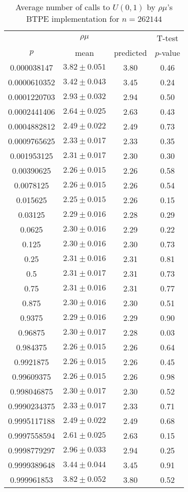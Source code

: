 \begin{table}[t]
\caption{Average number of calls to $U(0,1)$ by $\rho\mu$'s BTPE implementation for $n=262144$}
\label{tab:calls262144}
\begin{tabular}{cccc} \hline
    & $\rho\mu$ & & T-test \\
$p$ & mean & predicted & $p$-value \\ \hline
0.000038147  & $3.82 \pm 0.051$ & 3.80 & 0.46 \\
0.0000610352 & $3.42 \pm 0.043$ & 3.45 & 0.24 \\
0.0001220703 & $2.93 \pm 0.032$ & 2.94 & 0.50 \\
0.0002441406 & $2.64 \pm 0.025$ & 2.63 & 0.43 \\
0.0004882812 & $2.49 \pm 0.022$ & 2.49 & 0.73 \\
0.0009765625 & $2.33 \pm 0.017$ & 2.33 & 0.35 \\
0.001953125  & $2.31 \pm 0.017$ & 2.30 & 0.30 \\
0.00390625   & $2.26 \pm 0.015$ & 2.26 & 0.58 \\
0.0078125    & $2.26 \pm 0.015$ & 2.26 & 0.54 \\
0.015625     & $2.25 \pm 0.015$ & 2.26 & 0.15 \\
0.03125      & $2.29 \pm 0.016$ & 2.28 & 0.29 \\
0.0625       & $2.30 \pm 0.016$ & 2.29 & 0.22 \\
0.125        & $2.30 \pm 0.016$ & 2.30 & 0.73 \\
0.25         & $2.31 \pm 0.016$ & 2.31 & 0.81 \\
0.5          & $2.31 \pm 0.017$ & 2.31 & 0.73 \\
0.75         & $2.31 \pm 0.016$ & 2.31 & 0.77 \\
0.875        & $2.30 \pm 0.016$ & 2.30 & 0.51 \\
0.9375       & $2.29 \pm 0.016$ & 2.29 & 0.90 \\
0.96875      & $2.30 \pm 0.017$ & 2.28 & 0.03 \\
0.984375     & $2.26 \pm 0.015$ & 2.26 & 0.64 \\
0.9921875    & $2.26 \pm 0.015$ & 2.26 & 0.45 \\
0.99609375   & $2.26 \pm 0.015$ & 2.26 & 0.98 \\
0.998046875  & $2.30 \pm 0.017$ & 2.30 & 0.52 \\
0.9990234375 & $2.33 \pm 0.017$ & 2.33 & 0.71 \\
0.9995117188 & $2.49 \pm 0.022$ & 2.49 & 0.68 \\
0.9997558594 & $2.61 \pm 0.025$ & 2.63 & 0.15 \\
0.9998779297 & $2.96 \pm 0.033$ & 2.94 & 0.25 \\
0.9999389648 & $3.44 \pm 0.044$ & 3.45 & 0.91 \\
0.999961853  & $3.82 \pm 0.052$ & 3.80 & 0.52 \\
\hline
\end{tabular}
\end{table}

